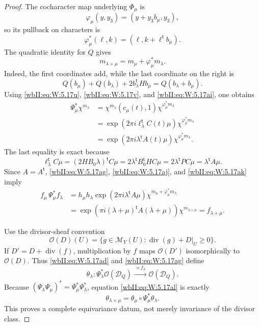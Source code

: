 \begin{proof}
The cocharacter map underlying \(\Phi_\mu\) is
\[
 \varphi_\mu(y,y_3)=(y+y_3b_\mu,y_3),
\]
so its pullback on characters is
\[
 \varphi_\mu^*(\ell,k)
 =(\ell,k+\ell^{\mathsf t}b_\mu).
\tag{W.76}\label{wbII:eq:W:5.17ai}
\]
The quadratic identity for \(Q\) gives
\[
 m_{\lambda+\mu}=m_\mu+\varphi_\mu^*m_\lambda.
\tag{W.77}\label{wbII:eq:W:5.17aj}
\]
Indeed, the first coordinates add, while the last coordinate on the
right is
\[
 Q(b_\mu)+Q(b_\lambda)+2b_\lambda^{\mathsf t}Hb_\mu
 =Q(b_\lambda+b_\mu).
\]
Using \eqref{wbII:eq:W:5.17u}, \eqref{wbII:eq:W:5.17v}, and \eqref{wbII:eq:W:5.17ai}, one obtains
\begin{align*}
 \Psi_\mu^*\chi^{m_\lambda}
 &=\chi^{m_\lambda}(c_\mu(t),1)
   \chi^{\varphi_\mu^*m_\lambda}\\
 &=\exp\!\left(2\pi i\ell_\lambda^{\mathsf t}C(t)\mu\right)
   \chi^{\varphi_\mu^*m_\lambda}\\
 &=\exp\!\left(2\pi i\lambda^{\mathsf t}A(t)\mu\right)
   \chi^{\varphi_\mu^*m_\lambda}.
\tag{W.78}\label{wbII:eq:W:5.17ak}
\end{align*}
The last equality is exact because
\[
 \ell_\lambda^{\mathsf t}C\mu
 =(2HB_0\lambda)^{\mathsf t}C\mu
 =2\lambda^{\mathsf t}B_0^{\mathsf t}HC\mu
 =2\lambda^{\mathsf t}PC\mu
 =\lambda^{\mathsf t}A\mu.
\]
Since \(A=A^{\mathsf t}\), \eqref{wbII:eq:W:5.17ag}, \eqref{wbII:eq:W:5.17aj}, and \eqref{wbII:eq:W:5.17ak} imply
\begin{align*}
 f_\mu\,\Psi_\mu^*f_\lambda
 &=h_\mu h_\lambda
   \exp(2\pi i\lambda^{\mathsf t}A\mu)
   \chi^{m_\mu+\varphi_\mu^*m_\lambda}\\
 &=\exp\!\left(
   \pi i(\lambda+\mu)^{\mathsf t}A(\lambda+\mu)\right)
   \chi^{m_{\lambda+\mu}}
 =f_{\lambda+\mu}.
\tag{W.79}\label{wbII:eq:W:5.17al}
\end{align*}

Use the divisor-sheaf convention
\[
 \mathcal O(D)(U)=
 \{g\in\mathcal M_Y(U):
   \operatorname{div}(g)+D|_U\geq0\}.
\]
If \(D'=D+\operatorname{div}(f)\), multiplication by \(f\) maps
\(\mathcal O(D')\) isomorphically to \(\mathcal O(D)\).  Thus
\eqref{wbII:eq:W:5.17ad} and \eqref{wbII:eq:W:5.17ag} define
\[
 \theta_\lambda:
 \Psi_\lambda^*\mathcal O(\mathcal D_Q)
 \xrightarrow{\ \times f_\lambda\ }
 \mathcal O(\mathcal D_Q).
\tag{W.80}\label{wbII:eq:W:5.17am}
\]
Because
\((\Psi_\lambda\Psi_\mu)^*=\Psi_\mu^*\Psi_\lambda^*\),
equation \eqref{wbII:eq:W:5.17al} is exactly
\[
 \theta_{\lambda+\mu}
 =\theta_\mu\circ\Psi_\mu^*\theta_\lambda.
\tag{W.81}\label{wbII:eq:W:5.17an}
\]
This proves a complete equivariance datum, not merely invariance of the
divisor class.


\end{proof}
